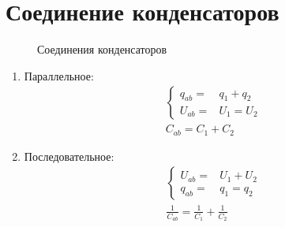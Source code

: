 \section{Соединение конденсаторов}

    \begin{figure}[b!]
        \center
        \hfill
        \caption{Соединения конденсаторов}
    \end{figure}
    \begin{enumerate}
        \item Параллельное:
        \begin{align}
        \left\{
        \begin{array}{rl}
            q_{ab} = & q_1 + q_2 \\
            U_{ab} = & U_1 = U_2
        \end{array} \right. \nonumber \\
        C_{ab} = C_1 + C_2 \nonumber
        \end{align}
        \item Последовательное: %
        \begin{align}
        \left\{
        \begin{array}{rl}
            U_{ab} = & U_1 + U_2 \\
            q_{ab} = & q_1 = q_2
        \end{array} \right. \nonumber \\
        \frac{1}{C_{ab}} = \frac{1}{C_1} + \frac{1}{C_2} \nonumber
        \end{align}
    \end{enumerate}

